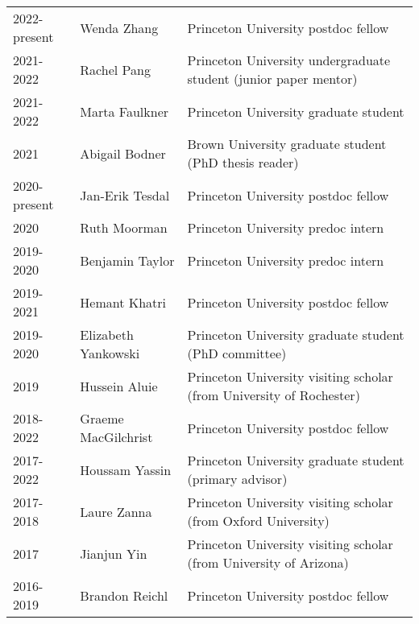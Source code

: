 \documentclass{article}
\begin{document}
\begin{tabular}{lll}

2022-present & Wenda Zhang& Princeton University postdoc fellow \\

2021-2022 & Rachel Pang& Princeton University undergraduate student (junior paper mentor) \\ 

2021-2022 & Marta Faulkner& Princeton University graduate student \\ 

2021 & Abigail Bodner& Brown University graduate student (PhD thesis reader) \\ 


2020-present & Jan-Erik Tesdal& Princeton University postdoc fellow \\ 
2020 & Ruth Moorman & Princeton University predoc intern \\ 

2019-2020 & Benjamin Taylor & Princeton University predoc intern \\ 

2019-2021 & Hemant Khatri & Princeton University postdoc fellow  \\ 

2019-2020 & Elizabeth Yankowski & Princeton University graduate student (PhD committee) \\ 

2019     & Hussein Aluie & Princeton University visiting scholar (from University of Rochester)  \\ 
2018-2022 & Graeme MacGilchrist & Princeton University postdoc fellow \\ 

2017-2022 & Houssam Yassin & Princeton University graduate student (primary advisor) \\ 

2017-2018 & Laure Zanna  & Princeton University visiting scholar (from Oxford University)  \\

2017 & Jianjun Yin       & Princeton University visiting scholar (from University of Arizona)  \\

2016-2019 & Brandon Reichl       & Princeton University postdoc fellow  \\


\end{tabular}
\end{document}
